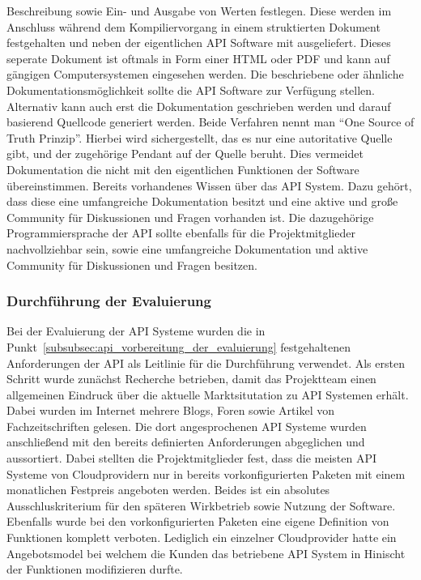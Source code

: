 \begin{outline}
  Beschreibung sowie Ein- und Ausgabe von Werten festlegen. Diese werden im
  Anschluss während dem Kompiliervorgang in einem struktierten Dokument
  festgehalten und neben der eigentlichen API Software mit ausgeliefert. Dieses
  seperate Dokument ist oftmals in Form einer HTML oder PDF und kann auf
  gängigen Computersystemen eingesehen werden. Die beschriebene oder ähnliche
  Dokumentationsmöglichkeit sollte die API Software zur Verfügung stellen.
  Alternativ kann auch erst die Dokumentation geschrieben werden und darauf
  basierend Quellcode generiert werden. Beide Verfahren nennt man ``One Source
  of Truth Prinzip''. Hierbei wird sichergestellt, das es nur eine autoritative
  Quelle gibt, und der zugehörige Pendant auf der Quelle beruht. Dies vermeidet
  Dokumentation die nicht mit den eigentlichen Funktionen der Software
  übereinstimmen.
  \1 Bereits vorhandenes Wissen über das API System. Dazu gehört, dass diese
  eine umfangreiche Dokumentation besitzt und eine aktive und große Community
  für Diskussionen und Fragen vorhanden ist. Die dazugehörige
  Programmiersprache der API sollte ebenfalls für die Projektmitglieder
  nachvollziehbar sein, sowie eine umfangreiche Dokumentation und aktive
  Community für Diskussionen und Fragen besitzen.
\end{outline}
\nl%

\subsubsection{Durchführung der Evaluierung}
\label{subsubsec:api_durchfuehrung_der_evaluierung}
Bei der Evaluierung der API Systeme wurden die in
Punkt~\ref{subsubsec:api_vorbereitung_der_evaluierung} festgehaltenen
Anforderungen der API als Leitlinie für die Durchführung verwendet. Als ersten
Schritt wurde zunächst Recherche betrieben, damit das Projektteam einen
allgemeinen Eindruck über die aktuelle Marktsitutation zu API Systemen erhält.
Dabei wurden im Internet mehrere Blogs, Foren sowie Artikel von
Fachzeitschriften gelesen.  Die dort angesprochenen API Systeme wurden
anschließend mit den bereits definierten Anforderungen abgeglichen und
aussortiert. Dabei stellten die Projektmitglieder fest, dass die meisten API
Systeme von Cloudprovidern nur in bereits vorkonfigurierten Paketen mit einem
monatlichen Festpreis angeboten werden.  Beides ist ein absolutes
Ausschluskriterium für den späteren Wirkbetrieb sowie Nutzung der Software.
Ebenfalls wurde bei den vorkonfigurierten Paketen eine eigene Definition von
Funktionen komplett verboten. Lediglich ein einzelner Cloudprovider hatte ein
Angebotsmodel bei welchem die Kunden das betriebene API System in Hinischt der
Funktionen modifizieren durfte.

